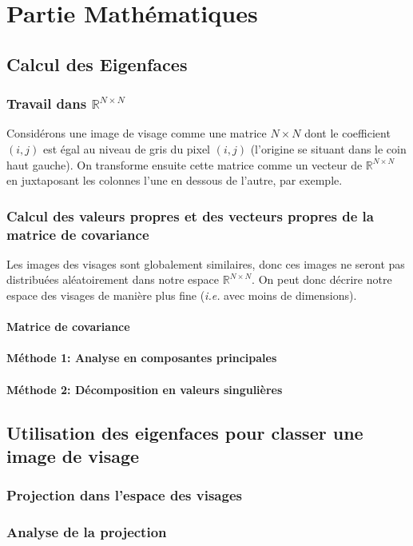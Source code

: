 \documentclass[12pt]{article}
\begin{document}
\maketitle
\newpage
\section{Partie Mathématiques}
\subsection{Calcul des Eigenfaces}
\subsubsection{Travail dans $\mathbb{R}^{N \times N}$}
Considérons une image de visage comme une matrice $N \times N$ dont le coefficient $(i,j)$ est égal au niveau de gris du pixel $(i,j)$ (l'origine se situant dans le coin haut gauche).  
On transforme ensuite cette matrice comme un vecteur de $\mathbb{R}^{N \times N}$ en juxtaposant les colonnes l'une en dessous de l'autre, par exemple.
\subsubsection{Calcul des valeurs propres et des vecteurs propres de la matrice de covariance}
Les images des visages sont globalement similaires, donc ces images ne seront pas distribuées aléatoirement dans notre espace $\mathbb{R}^{N \times N}$.
On peut donc décrire notre espace des visages de manière plus fine (\textit{i.e.} avec moins de dimensions).
\paragraph{Matrice de covariance}
\paragraph{Méthode 1: Analyse en composantes principales}
\paragraph{Méthode 2: Décomposition en valeurs singulières}
\subsection{Utilisation des eigenfaces pour classer une image de visage}
\subsubsection{Projection dans l'espace des visages}
\subsubsection{Analyse de la projection}
\end{document}
